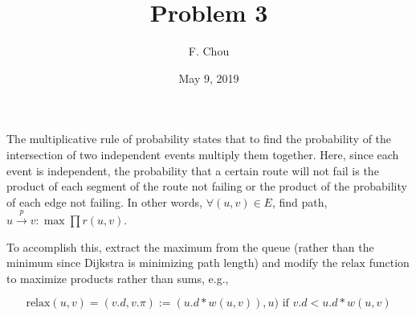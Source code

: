 \documentclass[12pt]{article}
\title{Problem 3}
\author{F. Chou}
\date{May 9, 2019}
\begin{document}
\maketitle


The multiplicative rule of probability states that to find the probability of the intersection of 
two independent events multiply them together. Here, since each event is independent, the probability
that a certain route will not fail is the product of each segment of the route not failing or the 
product of the probability of each edge not failing. In other words, $\forall (u, v) \in E$, find path, 
$u \xrightarrow{p} v : \max \prod r(u, v) $.


To accomplish this, extract the maximum from the queue (rather than the minimum since Dijkstra is minimizing path
length) and modify the $\textrm{relax}$ function to maximize products rather than sums, e.g.,

$$\textrm{relax}(u, v) = 
    (v.d, v.\pi) := (u.d * w(u, v)), u) \textrm{ if } v.d < u.d * w(u, v) 
$$
\end{document}
